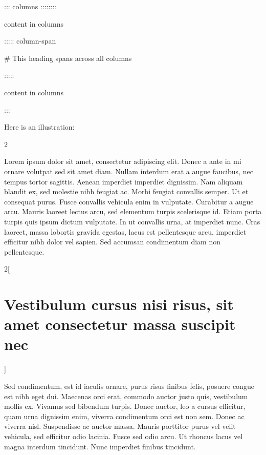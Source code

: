 \documentclass[
]{article}
\newenvironment{Shaded}{}{}
\newcommand{\NormalTok}[1]{#1}
\begin{document}
\begin{Shaded}
\begin{Highlighting}[]
\NormalTok{::: columns ::::::::}

\NormalTok{content in columns}

\NormalTok{::::: column{-}span}

\NormalTok{\# This heading spans across all columns}

\NormalTok{:::::}

\NormalTok{content in columns}

\NormalTok{:::}
\end{Highlighting}
\end{Shaded}

Here is an illustration:

{\setlength{\columnseprule}{ 1pt}
\renewcommand{\columnseprulecolor}{\color{black}}
\begin{multicols}{2}

Lorem ipsum dolor sit amet, consectetur adipiscing elit. Donec a ante in
mi ornare volutpat sed sit amet diam. Nullam interdum erat a augue
faucibus, nec tempus tortor sagittis. Aenean imperdiet imperdiet
dignissim. Nam aliquam blandit ex, sed molestie nibh feugiat ac. Morbi
feugiat convallis semper. Ut et consequat purus. Fusce convallis
vehicula enim in vulputate. Curabitur a augue arcu. Mauris laoreet
lectus arcu, sed elementum turpis scelerisque id. Etiam porta turpis
quis ipsum dictum vulputate. In ut convallis urna, at imperdiet nunc.
Cras laoreet, massa lobortis gravida egestas, lacus est pellentesque
arcu, imperdiet efficitur nibh dolor vel sapien. Sed accumsan
condimentum diam non pellentesque.

\end{multicols}
\begin{multicols}{2}[\hypertarget{vestibulum-cursus-nisi-risus-sit-amet-consectetur-massa-suscipit-nec}{%
\section{Vestibulum cursus nisi risus, sit amet consectetur massa
suscipit
nec}\label{vestibulum-cursus-nisi-risus-sit-amet-consectetur-massa-suscipit-nec}}]

Sed condimentum, est id iaculis ornare, purus risus finibus felis,
posuere congue est nibh eget dui. Maecenas orci erat, commodo auctor
justo quis, vestibulum mollis ex. Vivamus sed bibendum turpis. Donec
auctor, leo a cursus efficitur, quam urna dignissim enim, viverra
condimentum orci est non sem. Donec ac viverra nisl. Suspendisse ac
auctor massa. Mauris porttitor purus vel velit vehicula, sed efficitur
odio lacinia. Fusce sed odio arcu. Ut rhoncus lacus vel magna interdum
tincidunt. Nunc imperdiet finibus tincidunt.

\end{multicols}
}
\end{document}
